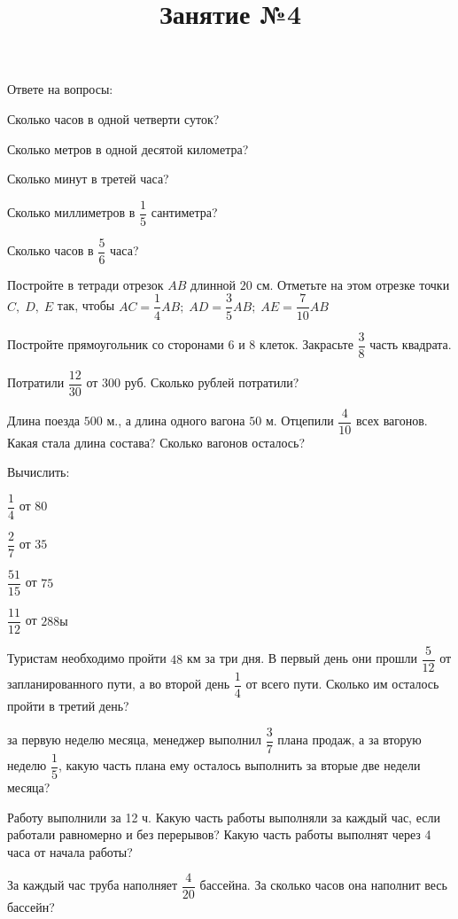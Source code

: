 \newpage
\title{Занятие №4}
\begin{listofex}
	\item Ответе на вопросы:
	\begin{enumcols}[itemcolumns=1]
		\item Сколько часов в одной четверти суток?
		\item Сколько метров в одной десятой километра?
		\item Сколько минут в третей часа?
		\item Сколько миллиметров в \( \dfrac{1}{5} \) сантиметра?
		\item Сколько часов в \( \dfrac{5}{6} \) часа?
	\end{enumcols}
	\item Постройте в тетради отрезок \( AB \) длинной \( 20 \) см. Отметьте на этом отрезке точки \( C,\;D,\;E \) так, чтобы \( AC=\dfrac{1}{4}AB;\;AD=\dfrac{3}{5}AB;\;AE=\dfrac{7}{10}AB \)
	\item Постройте прямоугольник со сторонами \( 6 \) и \( 8 \) клеток. Закрасьте \( \dfrac{3}{8} \) часть квадрата.
	\item Потратили \( \dfrac{12}{30} \) от \( 300 \) руб. Сколько рублей потратили?
	\item Длина поезда \( 500 \) м., а длина одного вагона \( 50 \) м. Отцепили \( \dfrac{4}{10} \) всех вагонов. Какая стала длина состава? Сколько вагонов осталось?
	\item Вычислить:
	\begin{enumcols}[itemcolumns=4]
		\item \( \dfrac{1}{4} \) от \( 80 \)
		\item \( \dfrac{2}{7} \) от \( 35 \)
		\item \( \dfrac{51}{15} \) от \( 75 \)
		\item \( \dfrac{11}{12} \) от \( 288ы \)
	\end{enumcols}
	\item Туристам необходимо пройти \( 48 \) км за три дня. В первый день они прошли \( \dfrac{5}{12} \) от запланированного пути, а во второй день \( \dfrac{1}{4} \) от всего пути. Сколько им осталось пройти в третий день?
	\item за первую неделю месяца, менеджер выполнил \( \dfrac{3}{7} \) плана продаж, а за вторую неделю \( \dfrac{1}{5} \), какую часть плана ему осталось выполнить за вторые две недели месяца?
	\item Работу выполнили за 12 ч. Какую часть работы выполняли за каждый час, если работали равномерно и без перерывов? Какую часть работы выполнят через 4 часа от начала работы?
	\item За каждый час труба наполняет \( \dfrac{4}{20} \) бассейна. За сколько часов она наполнит весь бассейн?
\end{listofex}
